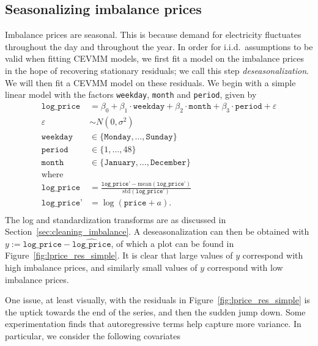 \documentclass[11pt,twoside,openany]{book}
\newcommand{\eps}{\varepsilon}
\newcommand{\code}[1]{\texttt{#1}}
\numberwithin{Theorem}{chapter}
\numberwithin{Definition}{chapter}
\numberwithin{Lemma}{chapter}
\numberwithin{Algorithm}{chapter}
\numberwithin{equation}{chapter}
\begin{document}
\subsection{Seasonalizing imbalance prices}

Imbalance prices are seasonal. This is because
demand for electricity fluctuates throughout the day and throughout the
year. In order for i.i.d.\ assumptions to be valid when fitting CEVMM models,
we first fit a model on the imbalance prices in the hope of recovering
stationary residuals; we call this step {\it deseasonalization}.
We will then fit a CEVMM model on these residuals.
We begin with a simple linear model with the factors \code{weekday}, \code{month}
and \code{period}, given by
\begin{equation}\label{eq:seasonal_imbalance_price_factor}
  \begin{split}
    \code{log_price} &= \beta_0 + \beta_1 \cdot \code{weekday} + \beta_2 \cdot \code{month} + \beta_3 \cdot \code{period} + \eps\\
    \eps &\sim N(0,\sigma^2)\\
    \code{weekday}&\in \{\code{Monday},\ldots,\code{Sunday}\}\\
    \code{period}& \in \{1,\ldots,48\}\\
    \code{month}& \in \{\code{January},\ldots,\code{December}\}\\
    \text{where}&\\
    \code{log_price} &= \frac{\code{log_price'} - \text{mean}(\code{log_price'})}
    {\text{std}(\code{log_price'})}\\
    \code{log_price'} &= \log(\code{price} +a).\\
  \end{split}
\end{equation}
The log and standardization transforms are as discussed
in Section~\ref{sec:cleaning_imbalance}.
 A deseasonalization can then be obtained with $y :=
\code{log_price} - \widehat{\code{log_price}}$, of which a plot can be
found in Figure~\ref{fig:lprice_res_simple}. It is clear that large values of
$y$ correspond with high imbalance prices, and similarly small values
of $y$ correspond with low imbalance prices.
\clearpage



One issue, at least visually, with the residuals in
Figure~\ref{fig:lprice_res_simple} is the uptick towards the end of the
series, and then the sudden jump down. Some experimentation finds
that autoregressive terms help capture more variance. In particular,
we consider the following covariates
\end{document}
